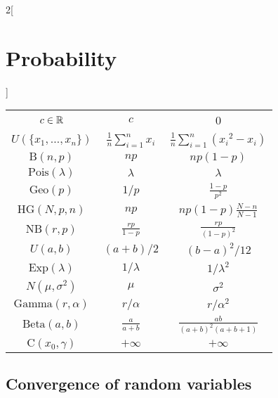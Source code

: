 \documentclass[../../../main.tex]{subfiles}
\begin{document}
\begin{multicols}{2}[\section{Probability}]
\begin{center}
\begin{tabular}{|c|c|c|}
            \hline
            $c\in\mathbb{R}$                & $\displaystyle c$              & 0                                           \\
            $U(\{x_1,\ldots,x_n\})$  & $\frac{1}{n}\sum_{i=1}^n x_i$  & $\frac{1}{n}\sum_{i=1}^n ({x_i}^2-x_i)$     \\
            $\text{B}(n,p)$          & $\displaystyle np$             & $\displaystyle np(1-p)$                     \\
            $\text{Pois}(\lambda)$   & $\displaystyle \lambda$        & $\displaystyle \lambda$                     \\
            $\text{Geo}(p)$          & $\displaystyle 1/p$            & $\displaystyle \frac{1-p}{p^2}$             \\
            $\text{HG}(N,p,n)$       & $\displaystyle np$             & $\displaystyle np(1-p)\frac{N-n}{N-1}$      \\
            $\text{NB}(r,p)$         & $\displaystyle \frac{rp}{1-p}$ & $\displaystyle \frac{rp}{{(1-p)}^2}$        \\
            $U(a,b)$                 & $\displaystyle (a+b)/2$        & $\displaystyle {(b-a)}^2/12$                \\
            $\text{Exp}(\lambda)$    & $\displaystyle 1/\lambda$      & $\displaystyle 1/\lambda^2$                 \\
            $N(\mu,\sigma^2)$        & $\displaystyle \mu$            & $\displaystyle \sigma^2$                    \\
            $\text{Gamma}(r,\alpha)$ & $\displaystyle r/\alpha$       & $\displaystyle r/\alpha^2$                  \\
            $\text{Beta}(a,b)$       & $\displaystyle \frac{a}{a+b}$  & $\displaystyle \frac{ab}{{(a+b)}^2(a+b+1)}$ \\
            $\text{C}(x_0,\gamma)$   & $\displaystyle +\infty$        & $\displaystyle +\infty$                     \\
            \hline
        \end{tabular}
    \end{center}
    \subsection{Convergence of random variables}

\end{multicols}
\end{document}
